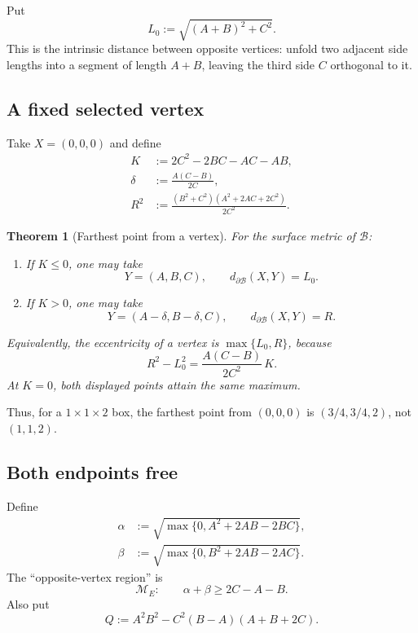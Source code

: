 \documentclass[11pt]{article}
\newtheorem{theorem}{Theorem}[section]
\theoremstyle{definition}
\newcommand{\Surf}{\partial\mathcal B}
\newcommand{\distS}{d_{\Surf}}
\begin{document}
Put
\begin{equation}\label{eq:L0}
  L_0:=\sqrt{(A+B)^2+C^2}.
\end{equation}
This is the intrinsic distance between opposite vertices: unfold two adjacent
side lengths into a segment of length $A+B$, leaving the third side $C$
orthogonal to it.

\subsection{A fixed selected vertex}

Take $X=(0,0,0)$ and define
\begin{equation}\label{eq:KdeltaR}
\begin{split}
  K&:=2C^2-2BC-AC-AB,\\
  \delta&:=\frac{A(C-B)}{2C},\\
  R^2&:=\frac{(B^2+C^2)(A^2+2AC+2C^2)}{2C^2}.
\end{split}
\end{equation}

\begin{theorem}[Farthest point from a vertex]\label{thm:fixed-summary}
For the surface metric of $\mathcal B$:
\begin{enumerate}[label=\textup{(\roman*)}]
\item If $K\le 0$, one may take
\[
  Y=(A,B,C),\qquad \distS(X,Y)=L_0.
\]
\item If $K>0$, one may take
\[
  Y=(A-\delta,B-\delta,C),\qquad \distS(X,Y)=R.
\]
\end{enumerate}
Equivalently, the eccentricity of a vertex is $\max\{L_0,R\}$, because
\begin{equation}\label{eq:fixed-gap}
  R^2-L_0^2=\frac{A(C-B)}{2C^2}\,K.
\end{equation}
At $K=0$, both displayed points attain the same maximum.
\end{theorem}

Thus, for a $1\times1\times2$ box, the farthest point from $(0,0,0)$ is
$(3/4,3/4,2)$, not $(1,1,2)$.

\subsection{Both endpoints free}

Define
\begin{equation}\label{eq:alpha-beta}
\begin{split}
 \alpha&:=\sqrt{\max\{0,A^2+2AB-2BC\}},\\
 \beta&:=\sqrt{\max\{0,B^2+2AB-2AC\}}.
\end{split}
\end{equation}
The ``opposite-vertex region'' is
\begin{equation}\label{eq:ME}
  \mathcal M_E:\qquad \alpha+\beta\ge 2C-A-B.
\end{equation}
Also put
\begin{equation}\label{eq:Q}
  Q:=A^2B^2-C^2(B-A)(A+B+2C).
\end{equation}
\end{document}
